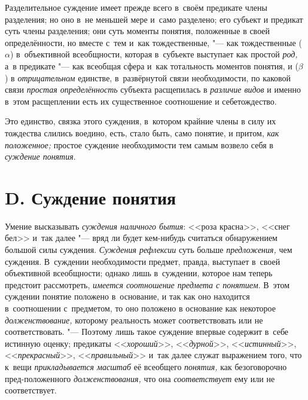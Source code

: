 Разделительное суждение имеет прежде всего в~своём предикате
члены разделения; но оно в~не меньшей мере и~само разделено; его субъект и
предикат суть члены разделения; они суть моменты понятия, положенные в
своей определённости, но вместе с~тем и~как тождественные, "---
как тождественные ($\alpha $) в~объективной всеобщности,
которая в~субъекте выступает как простой
{\em род,} а~в предикате
"--- как всеобщая сфера и~как тотальность моментов понятия, и
($\beta $) в {\em отрицательном}
единстве, в~развёрнутой связи необходимости, по каковой связи
{\em простая определённость}
субъекта расщепилась в
{\em различие видов} и
именно в~этом расщеплении есть их существенное соотношение и
себетождество.

Это единство, связка этого суждения, в~котором крайние члены в
силу их тождества слились воедино, есть, стало быть, само понятие, и
притом, {\em как положенное;}
простое суждение необходимости тем самым возвело себя в
{\em суждение понятия}.

\section[D. Суждение понятия]{D. Суждение понятия}

Умение высказывать
{\em суждения наличного бытия}:
<<роза красна>>, <<снег бел>> и~так далее "--- вряд
ли будет кем-нибудь считаться обнаружением большой силы суждения.
{\em Суждения рефлексии}
суть больше
{\em предложения,} чем
суждения. В~суждении необходимости предмет, правда,
выступает в~своей объективной всеобщности; однако лишь в~суждении, которое
нам теперь предстоит рассмотреть,
{\em имеется соотношение предмета с
понятием}. В~этом суждении понятие положено в~основание, и
так как оно находится в~соотношении с~предметом, то оно положено в
основание как некоторое
{\em долженствование,}
которому реальность может соответствовать или не
соответствовать. "--- Поэтому лишь такое суждение впервые
содержит в~себе истинную оценку; предикаты
<<{\em хороший}>>,
<<{\em дурной}>>,
<<{\em истинный}>>,
<<{\em прекрасный}>>,
<<{\em правильный}>> и~так
далее служат выражением того, что к~вещи
{\em прикладывается масштаб} её всеобщего
{\em понятия,} как
безоговорочно пред-положенного
{\em долженствования,}
что она
{\em соответствует} ему
или не соответствует.

